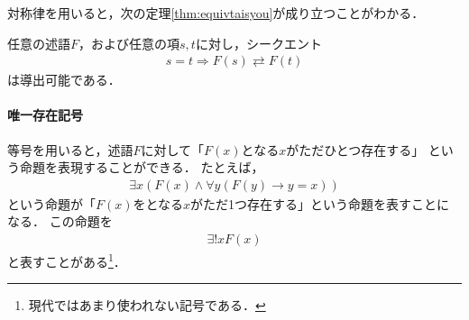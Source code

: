      対称律を用いると，次の定理\ref{thm:equivtaisyou}が成り立つことがわかる．
     \begin{thm} \label{thm:equivtaisyou}
       任意の述語$F$，および任意の項$s,  t$に対し，シークエント
       \begin{align}
         s = t \Longrightarrow F(s) \rightleftarrows F(t)
         \label{eq:equivtaisyou}
       \end{align}
       は導出可能である．
     \end{thm}

    \paragraph{唯一存在記号}
     等号を用いると，述語$F$に対して「$F(x)$となる$x$がただひとつ存在する」
     という命題を表現することができる．
     たとえば，
     \begin{align}
       \exists x ( F(x) \land \forall y (F(y) \to y=x))
       \label{eq:tadahitotu}
     \end{align}
     という命題が「$F(x)$をとなる$x$がただ1つ存在する」という命題を表すことになる．
     この命題を
     \begin{align}
       \exists ! x F(x)
       \label{eq:existsbikkuri}
     \end{align}
     と表すことがある\footnote{現代ではあまり使われない記号である．}．

